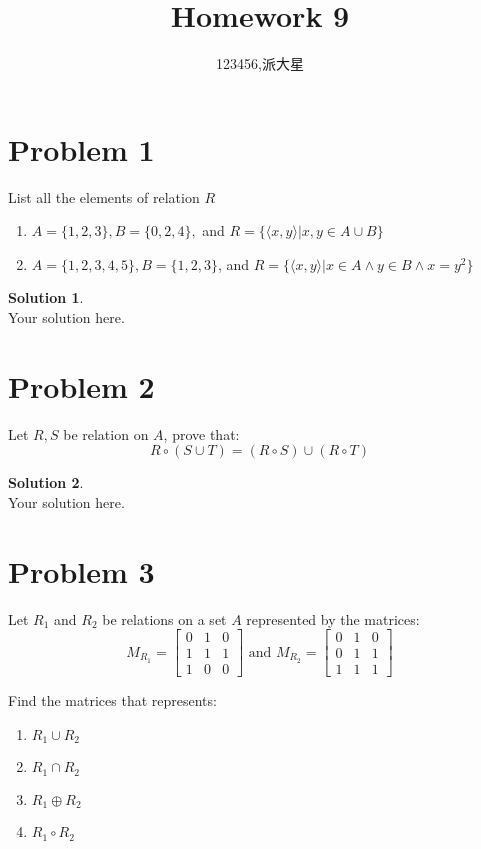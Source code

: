 \documentclass[a4paper,UTF8]{article}
\theoremstyle{definition}
\newtheorem*{solution}{Solution}
\begin{document}
\title{Homework 9}
\author{123456,派大星}
\maketitle


\section*{Problem 1}
List all the elements of relation $R$
\begin{enumerate}
	\item $A=\{1,2,3\},B=\{0,2,4\},$ and $R=\{\langle x,y\rangle | x,y \in A\cup B \}$
	\item $A=\{1,2,3,4,5\},B=\{1,2,3\}$, and $R=\{\langle x,y\rangle| x\in A \land y\in B \land x=y^2\}$
\end{enumerate}

\begin{solution}
	~\\
	Your solution here.
\end{solution}



\section*{Problem 2}
Let $R,S$ be relation on $A$, prove that:
$$R\circ(S\cup T)=(R\circ S) \cup (R\circ T)$$

\begin{solution}
	~\\
	Your solution here.
\end{solution}


\section*{Problem 3}
Let $R_1$ and $R_2$ be relations on a set $A$ represented by the matrices:
$$M_{R_{1}}=\left[\begin{array}{lll} 
0 & 1 & 0 \\ 
1 & 1 & 1 \\ 
1 & 0 & 0
\end{array}\right] \text 
{ and }
M_{R_{2}}=\left[\begin{array}{lll}
0 & 1 & 0 \\
0 & 1 & 1 \\ 
1 & 1 & 1
\end{array}\right]$$

Find the matrices that represents:
\begin{enumerate}
	\item $R_1\cup R_2$
	\item $R_1\cap R_2$
	\item $R_1\oplus R_2$
	\item $R_1\circ R_2$
	
\end{enumerate}
\end{document}
